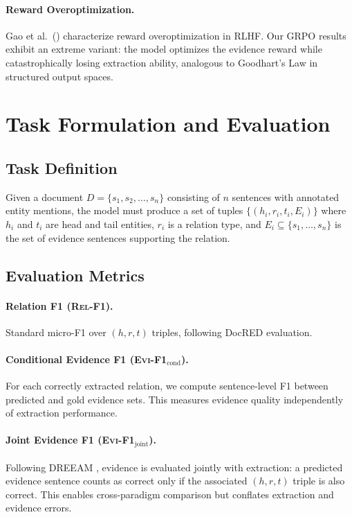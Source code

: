 \documentclass[11pt,a4paper]{article}
\newcommand{\evi}{\textsc{Evi-F1}}
\newcommand{\relf}{\textsc{Rel-F1}}
\begin{document}
\paragraph{Reward Overoptimization.}
Gao et al.\ (\citeyear{gao2023scaling}) characterize reward overoptimization in RLHF. Our GRPO results exhibit an extreme variant: the model optimizes the evidence reward while catastrophically losing extraction ability, analogous to Goodhart's Law in structured output spaces.

\section{Task Formulation and Evaluation}
\label{sec:task}

\subsection{Task Definition}

Given a document $D = \{s_1, s_2, \ldots, s_n\}$ consisting of $n$ sentences with annotated entity mentions, the model must produce a set of tuples $\{(h_i, r_i, t_i, E_i)\}$ where $h_i$ and $t_i$ are head and tail entities, $r_i$ is a relation type, and $E_i \subseteq \{s_1, \ldots, s_n\}$ is the set of evidence sentences supporting the relation.

\subsection{Evaluation Metrics}

\paragraph{Relation F1 (\relf{}).}
Standard micro-F1 over $(h, r, t)$ triples, following DocRED evaluation.

\paragraph{Conditional Evidence F1 (\evi{}$_\text{cond}$).}
For each correctly extracted relation, we compute sentence-level F1 between predicted and gold evidence sets. This measures evidence quality independently of extraction performance.

\paragraph{Joint Evidence F1 (\evi{}$_\text{joint}$).}
Following DREEAM \cite{ma2023dreeam}, evidence is evaluated jointly with extraction: a predicted evidence sentence counts as correct only if the associated $(h, r, t)$ triple is also correct. This enables cross-paradigm comparison but conflates extraction and evidence errors.
\end{document}
